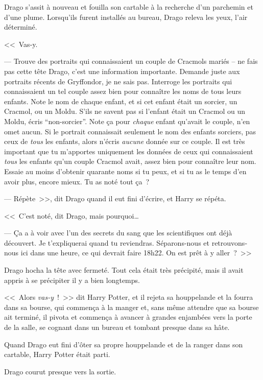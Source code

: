 Drago s'assit à nouveau et fouilla son cartable à la recherche d'un parchemin et d'une plume. Lorsqu'ils furent installés au bureau, Drago releva les yeux, l'air déterminé.

<<~Vas-y.

--- Trouve des portraits qui connaissaient un couple de Cracmols mariés -- ne fais pas cette tête Drago, c'est une information importante. Demande juste aux portraits récents de Gryffondor, je ne sais pas. Interroge les portraits qui connaissaient un tel couple assez bien pour connaître les noms de tous leurs enfants. Note le nom de chaque enfant, et si cet enfant était un sorcier, un Cracmol, ou un Moldu. S'ils ne savent pas si l'enfant était un Cracmol ou un Moldu, écris “non-sorcier”. Note ça pour \emph{chaque} enfant qu'avait le couple, n'en omet aucun. Si le portrait connaissait seulement le nom des enfants sorciers, pas ceux de \emph{tous} les enfants, alors n'écris \emph{aucune} donnée sur ce couple. Il est très important que tu m'apportes uniquement les données de ceux qui connaissaient \emph{tous} les enfants qu'un couple Cracmol avait, assez bien pour connaître leur nom. Essaie au moins d'obtenir quarante noms si tu peux, et si tu as le temps d'en avoir plus, encore mieux. Tu as noté tout ça~?

--- Répète~>>, dit Drago quand il eut fini d'écrire, et Harry se répéta.

<<~C'est noté, dit Drago, mais pourquoi…

--- Ça a à voir avec l'un des secrets du sang que les scientifiques ont déjà découvert. Je t'expliquerai quand tu reviendras. Séparons-nous et retrouvons-nous ici dans une heure, ce qui devrait faire 18h22. On est prêt à y aller~?~>>

Drago hocha la tête avec fermeté. Tout cela était très précipité, mais il avait appris à se précipiter il y a bien longtemps.

<<~Alors \emph{vas-y}~!~>> dit Harry Potter, et il rejeta sa houppelande et la fourra dans sa bourse, qui commença à la manger et, sans même attendre que sa bourse ait terminé, il pivota et commença à avancer à grandes enjambées vers la porte de la salle, se cognant dans un bureau et tombant presque dans sa hâte.

Quand Drago eut fini d'ôter sa propre houppelande et de la ranger dans son cartable, Harry Potter était parti.

Drago courut presque vers la sortie.~
